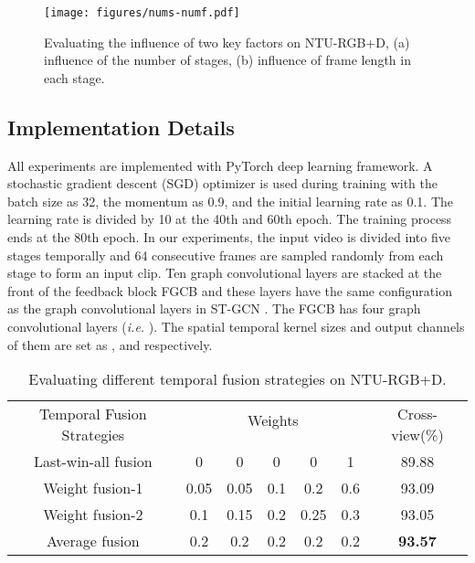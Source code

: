 \documentclass[runningheads]{llncs}
\begin{document}
\begin{figure}[t]
	\centering
	\texttt{[image: figures/nums-numf.pdf]}
	\caption{Evaluating the influence of two key factors on NTU-RGB+D, (a) influence of the number of stages, (b) influence of frame length in each stage.}
	\vspace{-4mm}
	\label{fig-numf-nums}
\end{figure}

\vspace{-1mm}
\subsection{Implementation Details}

All experiments are implemented with PyTorch deep learning framework. A stochastic gradient descent (SGD) optimizer is used during training with the batch size as 32, the momentum as 0.9, and the initial learning rate as 0.1. The learning rate is divided by 10 at the 40th and 60th epoch. The training process ends at the 80th epoch. In our experiments, the input video is divided into five stages temporally and 64 consecutive frames are sampled randomly from each stage to form an input clip.
Ten graph convolutional layers are stacked at the front of the feedback block FGCB and these layers have the same configuration as the graph convolutional layers in ST-GCN \cite{yan2018spatial}. The FGCB has four graph convolutional layers (\textit{i.e.} ). The spatial temporal kernel sizes and output channels of them are set as ,  and  respectively.


\begin{table}[ht]
\caption{ Evaluating different temporal fusion strategies on NTU-RGB+D.}
	\label{tab-temporal-fusion}
	\tabcolsep=6pt
	\centering
	\begin{tabular}{ccccccc}
		\hline
		\multirow{2}{*}{Temporal Fusion Strategies} &  \multicolumn{5}{c}{ Weights } &\multirow{2}{*}{Cross-view(\%)} \\
		\cline{2-6}
		&  &  &  &  &   & \\
		\hline		
		Last-win-all fusion &0&0&0&0&1&89.88 \\
		Weight fusion-1 &0.05&0.05&0.1&0.2&0.6&93.09 \\
		Weight fusion-2 &0.1&0.15&0.2&0.25&0.3&93.05 \\
		Average fusion &0.2&0.2&0.2&0.2&0.2&\textbf{93.57} \\
		\hline
	\end{tabular}
\end{table}
\end{document}
